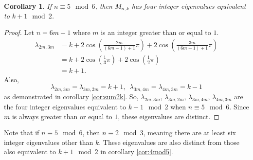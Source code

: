 \documentclass[12pt]{article}
\newtheorem{corollary}{Corollary}
\begin{document}
	\begin{corollary}\label{cor:black0_redcycle}\label{cor:5mod6}
		If $n \equiv 5 \mod 6$, then $M_{n,k}$ has four integer eigenvalues equivalent
		to $k+1 \mod 2$.
	\end{corollary}
	\begin{proof}
		Let $n = 6m-1$ where $m$ is an integer greater than or equal to $1$.
		\begin{align*}
		\lambda_{2m,3m} &= k + 2\cos{\left(\frac{2m}{(6m-1)+1}\pi\right)} +
		2\cos{\left(\frac{3m}{(6m-1)+1}\pi\right)} \\
		&= k + 2\cos{\left(\frac{1}{3}\pi\right)} +
		2\cos{\left(\frac{1}{2}\pi\right)} \\
		&= k + 1.
		\end{align*}
		Also,
		\begin{equation*}
		\lambda_{2m,3m} = \lambda_{3m,2m} = k+1, \hspace{6pt} \lambda_{3m,4m} =
		\lambda_{4m,3m} = k-1
		\end{equation*}
		as demonstrated in corollary \ref{cor:sum2k}. So, $\lambda_{2m,3m}$,
		$\lambda_{3m,2m}$, $\lambda_{3m,4m}$, $\lambda_{4m,3m}$ are the four integer
		eigenvalues equivalent to $k+1 \mod 2$ when $n \equiv 5 \mod 6$. Since $m$ is
		always greater than or equal to $1$, these eigenvalues are distinct.
	\end{proof}
	Note that if $n \equiv 5 \mod 6$, then $n \equiv 2 \mod 3$, meaning there are
	at least six integer eigenvalues other than $k$.
	These eigenvalues are also distinct from those also equivalent to $k + 1 \mod
	2$ in corollary \ref{cor:4mod5}.
	
\end{document}

